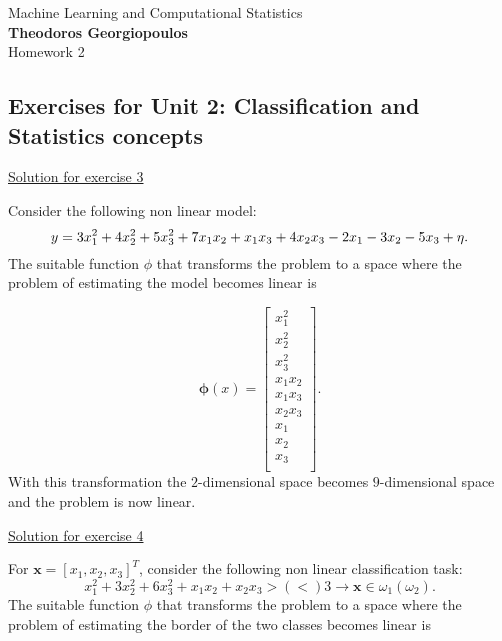 \documentclass[12pt]{book}
\theoremstyle{definition}
\begin{document}
\begin{center}
{\Large Machine Learning and Computational Statistics}\\
\large\textbf{Theodoros Georgiopoulos}\\ %
\Large Homework 2 %
\end{center}

\vspace{0.2 cm}


\subsection*{Exercises for Unit 2: Classification and Statistics concepts}

\vspace{0.2 cm}

{\underline{\large Solution for exercise 3}}
\vspace{0.1 cm}

\noindent
Consider the following non linear model:
\begin{equation}
y = 3x_1^2 + 4x_2^2 + 5x_3^2 + 7x_1x_2 + x_1x_3 \\
+ 4x_2x_3 - 2 x_1 - 3x_2 - 5x_3 + \eta.
\end{equation}
The suitable function $\phi$ that transforms the problem to a space where the problem of estimating the model becomes linear is

\begin{equation}
\bm{\phi}(x) = \begin{bmatrix}
x_{1}^2  \\
x_2^2 \\
x_3^2 \\
x_1x_2 \\
x_1x_3\\
x_2x_3\\
x_1\\
x_2\\
x_3\\
\end{bmatrix}.
\end{equation}
With this transformation the $2$-dimensional space becomes $9$-dimensional space and the problem is now linear.

\vspace{0.5 cm}
\noindent
{\underline{\large Solution for exercise 4}}
\vspace{0.3 cm}

\noindent
For $\bm{x} = [x_1,x_2,x_3]^T$, consider the following non linear classification task:
\begin{equation}
x_1^2 + 3x_2^2 + 6x_3^2 + x_1x_2 + x_2x_3 > (<)3 \rightarrow \bm{x} \in \omega_1 (\omega_2).
\end{equation}
The suitable function $\phi$ that transforms the problem to a space where the problem
of estimating the border of the two classes becomes linear is
\end{document}
